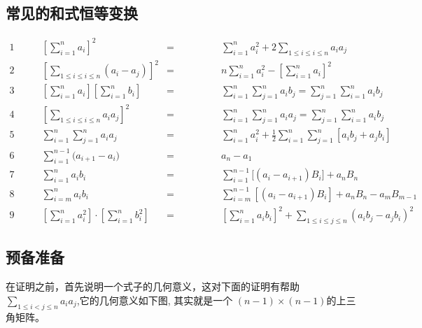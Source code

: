 \subsection{常见的和式恒等变换}
\begin{theorem}[和式恒等变换]
    \begin{align*}
    \num{1}\qquad & \left[\sum_{i=1}^{n}{a_i}\right]^2
        & = &\qquad\qquad \sum_{i=1}^{n}{a_i^2} + 2\sum_{1 \le i \le i \le n}{a_i a_j}\\
    \num{2}\qquad & \left[\sum_{1 \le i \le i \le n}{(a_i - a_j)}\right]^2
        & = &\qquad\qquad n\sum_{i=1}^{n}{a_i^2} - \left[\sum_{i=1}^{n}{a_i}\right]^2\\
    \num{3}\qquad & \left[\sum_{i=1}^{n}{a_i}\right] \left[\sum_{i=1}^{n}{b_i}\right]
        & = &\qquad\qquad \sum_{i=1}^{n}{\sum_{j=1}^{n}{a_i b_j}} = \sum_{j=1}^{n}{\sum_{i=1}^{n}{a_i b_j}}\\
    \num{4}\qquad & \left[\sum_{1 \le i \le i \le n}{a_ia_j}\right]^2
        & = &\qquad\qquad \sum_{i=1}^{n}{\sum_{j=1}^{n}{a_i a_j}} = \sum_{j=1}^{n}{\sum_{i=1}^{n}{a_i b_j}}\\
    \num{5}\qquad & \sum_{i=1}^{n}{\sum_{j=1}^{n}{a_i a_j}}
        & = &\qquad\qquad \sum_{i=1}^{n}{a_i^2} + \frac{1}{2} \sum_{i=1}^{n}{\sum_{j=1}^{n}{[a_i b_j + a_j b_i]}}\\
    \num{6}\qquad & \sum_{i=1}^{n-1}{\biggl(a_{i+1}-a_i\biggr)}
        & = &\qquad\qquad a_n-a_1\\
    \num{7}\qquad & \sum_{i=1}^{n}{a_ib_i}
        & = &\qquad\qquad \sum_{i=1}^{n-1}{\bigg[(a_i-a_{i+1})B_i\bigg]} + a_nB_n\\
    \num{8}\qquad & \sum_{i=m}^{n}{a_ib_i}
        & = &\qquad\qquad \sum_{i=m}^{n-1}{[(a_i-a_{i+1})B_i]} + a_nB_n - a_mB_{m-1}\\
    \num{9}\qquad & \left[\sum_{i=1}^{n}{a_i^2}\right]\cdot \left[\sum_{i=1}^{n}{b_i^2}\right]
        & = &\qquad\qquad \left[\sum_{i=1}^{n}{a_ib_i}\right]^2 + \sum_{1\le i \le j \le n}({a_ib_j-a_jb_i})^2
    \end{align*}
\end{theorem}

\subsection{预备准备}
在证明之前，首先说明一个式子的几何意义，这对下面的证明有帮助
$\sum\limits_{1 \leq i<j \leq n} a_{i} a_{j} $,它的几何意义如下图,
其实就是一个 $(n-1)\times (n-1)$的上三角矩阵。

